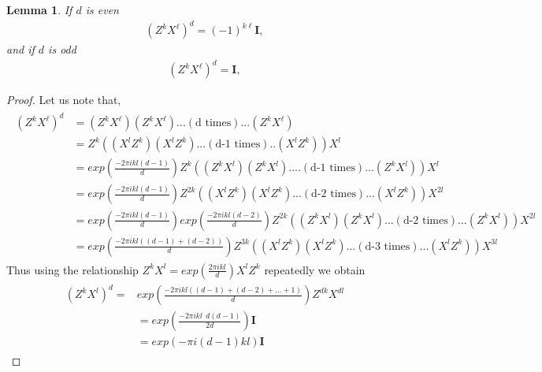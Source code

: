 \documentclass[12pt]{amsart}
\numberwithin{equation}{section}
\newtheorem{lemma}{Lemma}[section]
\begin{document}
\begin{lemma} If $d$ is even
\begin{eqnarray*}
    (Z^k X^\ell)^d = (-1)^{k \ell} \mathbf{I} ,
\end{eqnarray*}
and if $d$ is odd
\begin{eqnarray*}
    (Z^k X^\ell)^d =  \mathbf{I} ,
\end{eqnarray*}

\end{lemma}
\begin{proof}
Let us note that,\\
\begin{eqnarray*} 
        \begin{split}
(Z^k X^\ell)^d
    &=(Z^k X^\ell)(Z^k X^\ell)...(\text{d times})...(Z^k X^\ell)
\\[1ex]
 &=Z^k\left((X^lZ^k)(X^lZ^k)...(\text{d-1 times})..(X^lZ^k)\right)X^l
\\[1ex]
&=
 exp \left( \frac{-2 \pi ikl (d-1)}{d}\right) Z^k \left((Z^kX^l)(Z^kX^l)....(\text{d-1 times})...(Z^kX^l)\right)X^l\\[1ex]
&= exp \left( \frac{-2 \pi ikl (d-1)}{d}\right) Z^{2k} \left( (X^lZ^k)(X^lZ^k)...(\text{d-2 times})...(X^lZ^k)\right)X^{2l}\\[1ex]
&=exp \left( \frac{-2 \pi ikl (d-1)}{d}\right)exp \left( \frac{-2 \pi ikl (d-2)}{d}\right)Z^{2k}\left((Z^kX^l)(Z^kX^l)...(\text{d-2 times})...(Z^kX^l) \right)X^{2l}\\[1ex]
&=exp \left( \frac{-2 \pi ikl \left((d-1)+(d-2)\right)}{d}\right) Z^{3k} \left( (X^lZ^k)(X^lZ^k)...(\text{d-3 times})...(X^lZ^k)\right)X^{3l}
\end{split}
\end{eqnarray*}
Thus using the relationship $Z^kX^l=exp \left( \frac{2 \pi ikl}{d}\right)X^lZ^k$ repeatedly we obtain\\

\begin{eqnarray*}\begin{split}
    \left(Z^kX^l \right)^d=&exp \left( \frac{-2 \pi ikl \left((d-1)+(d-2)+...+1 \right)}{d}\right) Z^{dk}X^{dl}\\[1ex]
  &=exp \left( \frac{-2 \pi ikl ~~d(d-1)}{2d}\right)\mathbf{I}\\[1ex]
  &=exp \left( - \pi i (d-1) k l\right)\mathbf{I}
    \end{split}
\end{eqnarray*}


\end{proof}
\end{document}
